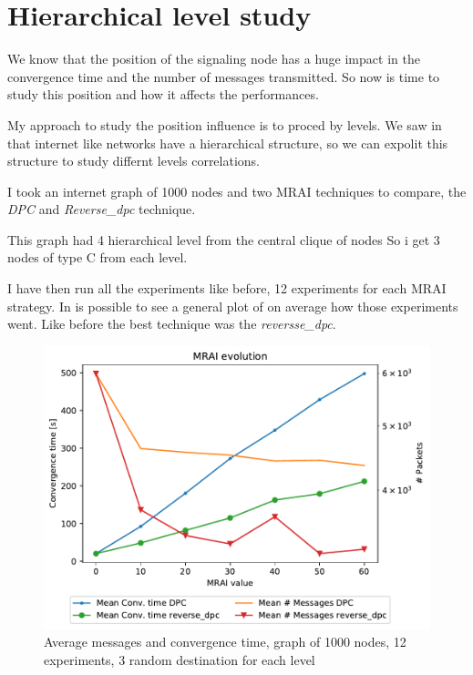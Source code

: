 \documentclass[10pt,conference,letterpaper]{IEEEtran}
\newcommand{\figwidth}{0.78}
\begin{document}
\clearpage

\section{Hierarchical level study}

We know that the position of the signaling node has a huge impact in the convergence
time and the number of messages transmitted.
So now is time to study this position and how it affects the performances.

My approach to study the position influence is to proced by levels.
We saw in  that internet like
networks have a hierarchical structure, so we can expolit this structure to
study differnt levels correlations.

I took an internet graph of \num{1000} nodes and two \ac{MRAI} techniques 
to compare, the \textit{DPC} and \textit{Reverse\_dpc} technique.

This graph had 4 hierarchical level from the central clique of nodes
So i get \num{3} nodes of type C from each level.

I have then run all the experiments like before, \num{12} experiments for each
\ac{MRAI} strategy.
In  is possible to see a general plot of
on average how those experiments went.
Like before the best technique was the \textit{reversse\_dpc}.

\begin{figure}[tb]
	\centering
	\includegraphics[width=\figwidth\columnwidth]{images/different_levels/different_levels-1000_mean}
	\caption{Average messages and convergence time, graph of \num{1000} nodes, 
			 \num{12} experiments, \num{3} random destination for each level}
	\label{fig:1000-mean-different_levels}
\end{figure}
\end{document}

